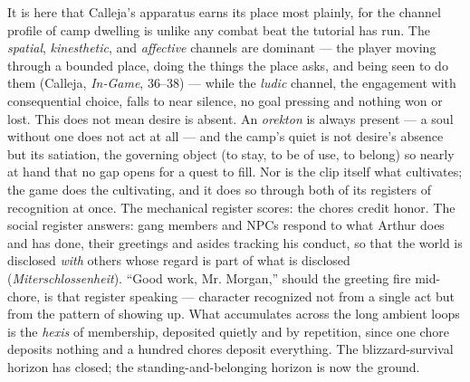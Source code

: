 \documentclass{article}
\begin{document}
It is here that Calleja's apparatus earns its place most plainly, for the channel profile of camp dwelling is unlike any combat beat the tutorial has run. The \textit{spatial}, \textit{kinesthetic}, and \textit{affective} channels are dominant — the player moving through a bounded place, doing the things the place asks, and being seen to do them (Calleja, \textit{In-Game}, 36–38) — while the \textit{ludic} channel, the engagement with consequential choice, falls to near silence, no goal pressing and nothing won or lost. This does not mean desire is absent. An \textit{orekton} is always present — a soul without one does not act at all — and the camp's quiet is not desire's absence but its satiation, the governing object (to stay, to be of use, to belong) so nearly at hand that no gap opens for a quest to fill. Nor is the clip itself what cultivates; the game does the cultivating, and it does so through both of its registers of recognition at once. The mechanical register scores: the chores credit honor. The social register answers: gang members and NPCs respond to what Arthur does and has done, their greetings and asides tracking his conduct, so that the world is disclosed \textit{with} others whose regard is part of what is disclosed (\textit{Miterschlossenheit}). ``Good work, Mr. Morgan,'' should the greeting fire mid-chore, is that register speaking — character recognized not from a single act but from the pattern of showing up. What accumulates across the long ambient loops is the \textit{hexis} of membership, deposited quietly and by repetition, since one chore deposits nothing and a hundred chores deposit everything. The blizzard-survival horizon has closed; the standing-and-belonging horizon is now the ground.
\end{document}
